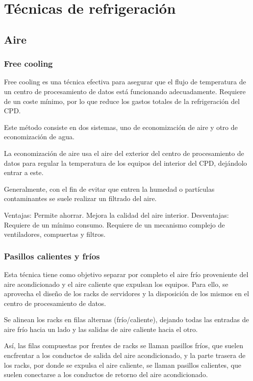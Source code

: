 \section*{Técnicas de refrigeración}

\subsection*{Aire}
\subsubsection*{Free cooling}

Free cooling es una técnica efectiva para asegurar que el flujo de temperatura de un centro de procesamiento de datos está funcionando adecuadamente. Requiere de un coste mínimo, por lo que reduce los gastos totales de la refrigeración del CPD.

Este método consiste en dos sistemas, uno de economización de aire y otro de economización de agua.

La economización de aire usa el aire del exterior del centro de procesamiento de datos para regular la temperatura de los equipos del interior del CPD, dejándolo entrar a este.

Generalmente, con el fin de evitar que entren la humedad o partículas contaminantes se suele realizar un filtrado del aire.



Ventajas:
Permite ahorrar.
Mejora la calidad del aire interior.
Desventajas:
Requiere de un mínimo consumo.
Requiere de un mecanismo complejo de ventiladores, compuertas y filtros.

\subsubsection*{Pasillos calientes y fríos}

Esta técnica tiene como objetivo separar por completo el aire frío proveniente del aire acondicionado y el aire caliente que expulsan los equipos. Para ello, se aprovecha el diseño de los racks de servidores y la disposición de los mismos en el centro de procesamiento de datos.

Se alinean los racks en filas alternas (frío/caliente), dejando todas las entradas de aire frío hacia un lado y las salidas de aire caliente hacia el otro.

Así, las filas compuestas por frentes de racks se llaman pasillos fríos, que suelen encfrentar a los conductos de salida del aire acondicionado, y la parte trasera de los racks, por donde se expulsa el aire caliente, se llaman pasillos calientes, que suelen conectarse a los conductos de retorno del aire acondicionado.




